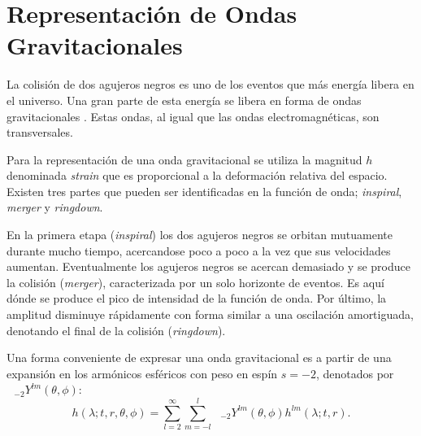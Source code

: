 
 






\section{Representación de Ondas Gravitacionales}

La colisión de dos agujeros negros es uno de los eventos que más energía libera en el universo. Una gran parte de esta energía se libera en forma de ondas gravitacionales \cite{Centrella_2010}. Estas ondas, al igual que las ondas electromagnéticas, son transversales.

Para la representación de una onda gravitacional se utiliza la magnitud $h$ denominada \textit{strain} que es proporcional a la deformación relativa del espacio. Existen tres partes que pueden ser identificadas en la función de onda; \textit{inspiral}, \textit{merger} y \textit{ringdown}. 

En la primera etapa (\textit{inspiral}) los dos agujeros negros se orbitan mutuamente durante mucho tiempo, acercandose poco a poco a la vez que sus velocidades aumentan. Eventualmente los agujeros negros se acercan demasiado y se produce la colisión (\textit{merger}), caracterizada por un solo horizonte de eventos. Es aquí dónde se produce el pico de intensidad de la función de onda. Por último, la amplitud disminuye rápidamente con forma similar a una oscilación amortiguada, denotando el final de la colisión (\textit{ringdown}).

Una forma conveniente de expresar una onda gravitacional es a partir de una expansión en los armónicos esféricos con peso en espín $s=-2$, denotados por $\text{ }_{-2} Y^{lm} (\theta, \phi)$:
\begin{equation}
h( \lambda; t, r, \theta , \phi) =  \sum_{l=2}^{\infty}  \sum_{m=-l}^{l} \text{ }_{-2} Y^{lm} (\theta, \phi) h^{lm}(\lambda; t, r).
\end{equation}


